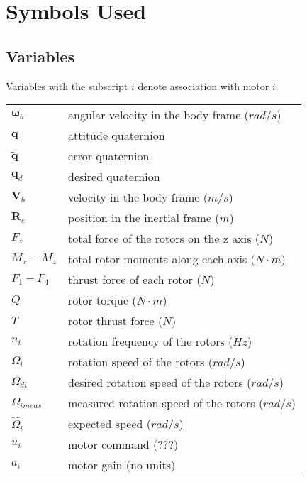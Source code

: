 \documentclass{article}
\numberwithin{equation}{section} %
\newcommand{\bs}[1]{\boldsymbol{#1}}
\begin{document}
\section{Symbols Used}

\subsection{Variables}

Variables with the subscript $i$ denote association with motor $i$.\\
\begin{tabular}{l l}
 	$ \bs{\omega}_{b} $ 	& angular velocity in the body frame ($rad/s$) \\
 	$ \mathbf{q} $ 			& attitude quaternion \\
 	$ \tilde{\mathbf{q}} $	& error quaternion \\
 	$ \mathbf{q}_d $		& desired quaternion \\
 	$ \boldsymbol{V}_{b} $ 	& velocity in the body frame ($m/s$) \\
 	$ \boldsymbol{R}_{e} $	& position in the inertial frame ($m$) \\
 	$ F_{z} $				& total force of the rotors on the z axis ($N$) \\
 	$ M_{x} - M_{z} $		& total rotor moments along each axis ($N \cdot m$) \\
 	$ F_{1} - F_{4} $		& thrust force of each rotor ($N$) \\
 	$ Q $					& rotor torque ($N \cdot m$) \\
 	$ T $					& rotor thrust force ($N$) \\
 	$ n_i $					& rotation frequency of the rotors ($Hz$) \\
 	$ \Omega_i $			& rotation speed of the rotors ($rad / s$) \\	
 	$ \Omega_{di} $			& desired rotation speed of the rotors ($rad / s$) \\
 	$ \Omega_{imeas} $		& measured rotation speed of the rotors ($rad / s$) \\
 	$ \hat{\Omega}_i $		& expected speed ($rad / s$) \\
 	$ u_i $					& motor command ($???$) \\
 	$ a_i $					& motor gain (no units) \\

\end{tabular}
\end{document}
